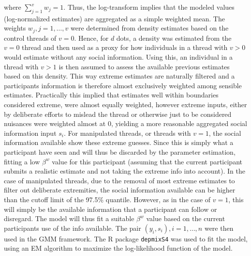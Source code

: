 \documentclass[9pt,a4paper,twocolumn,lineno]{article}
\begin{document}
where $\sum_{j=1}^v w_j = 1$. Thus, the log-transform implies that the modeled values (log-normalized estimates) are aggregated as a simple weighted mean. The weights $w_j, j=1,\dots,v$ were determined from density estimates based on the control threads of $v=0$. Hence, for $d$ dots, a density was estimated from the $v=0$ thread and then used as a proxy for how individuals in a thread with $v>0$ would estimate without any social information. Using this, an individual in a thread with $v>1$ is then assumed to assess the available previous estimates based on this density. This way extreme estimates are naturally filtered and a participants information is therefore almost exclusively weighted among sensible estimates. Practically this implied that estimates well within boundaries considered extreme, were almost equally weighted, however extreme inputs, either by deliberate efforts to mislead the thread or otherwise just to be considered nuisances were weighted almost at 0, yielding a more reasonable aggregated social information input $s_i$. For manipulated threads, or threads with $v=1$, the social information available show these extreme guesses. Since this is simply what a participant have seen and will thus be discarded by the parameter estimation, fitting a low $\beta^w$ value for this participant (assuming that the current participant submits a realistic estimate and not taking the extreme info into account). In the case of manipulated threads, due to the removal of most extreme estimates to filter out deliberate extremities, the social information available can be higher than the cutoff limit of the 97.5\% quantile. However, as in the case of $v=1$, this will simply be the available information that a participant can follow or disregard. The model will thus fit a suitable $\beta^w$ value based on the current participants use of the info available. The pair $(y_i,s_i), i=1,\dots,n$ were then used in the GMM framework. The R package \texttt{depmixS4} \cite{visser2010} was used to fit the model, using an EM algorithm to maximize the log-likelihood function of the model. 
\end{document}
